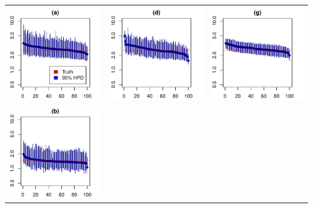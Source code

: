 \documentclass{standalone}
\begin{document}
\renewcommand{\tabcolsep}{0pt}
\begin{tabular}{ccc}
\includegraphics[width=6.3cm]{Fig3_a.pdf} 
 & \includegraphics[width=6.3cm]{Fig3_d.pdf}
 & \includegraphics[width=6.3cm]{Fig3_g.pdf} \\
\includegraphics[width=6.3cm]{Fig3_b.pdf}

\end{tabular}
\end{document}
